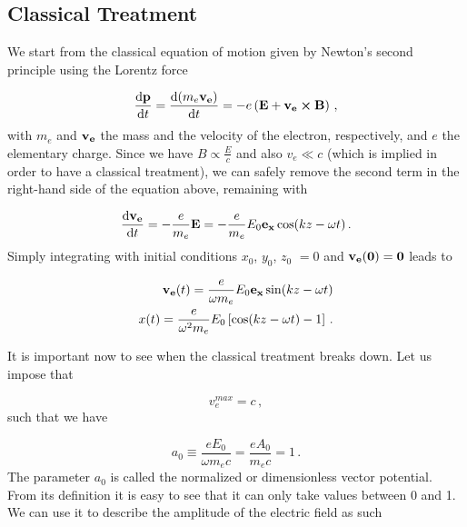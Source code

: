 \documentclass[12pt, class=report, crop=false]{standalone}
\begin{document}
\subsection{Classical Treatment}

We start from the classical equation of motion given by Newton's second principle using the Lorentz force

\begin{equation}
  \label{eq:equation-of-motion-electron}
  \dv{\vb{p}}{t} = \dv{(m_e \vb{v_e})}{t} = - e \left( \vb{E} + \vb{v_e}\cp\vb{B} \right)\,,
\end{equation}
with \(m_e\) and \(\vb{v_e}\) the mass and the velocity of the electron, respectively, and \(e\) the elementary charge. Since we have \(B\propto\frac{E}{c}\) and also \(v_e \ll c\) (which is implied in order to have a classical treatment), we can safely remove the second term in the right-hand side of the equation above, remaining with

\begin{equation}
  \dv{\vb{v_e}}{t} = - \frac{e}{m_e} \vb{E} = - \frac{e}{m_e}  E_0 \vb{e_x} \cos(kz-\omega t)\,.
\end{equation}
Simply integrating with initial conditions \(x_0\), \(y_0\), \(z_0\) \(=0\) and \(\vb{v_e(0)} = \vb{0}\) leads to

\begin{subequations}
  \begin{align}
    \vb{v_e} (t) = \frac{e}{\omega m_e} E_0 \vb{e_x} \sin(kz-\omega t) \\
    x (t) = \frac{e}{\omega^2 m_e} E_0 \left[ \cos(kz-\omega t) -1 \right]\,.
  \end{align}
\end{subequations}

It is important now to see when the classical treatment breaks down. Let us impose that

\begin{equation}
  v_e^{max} = c \,,
\end{equation}
such that we have

\begin{equation}
  a_0 \equiv \frac{e E_0}{\omega m_e c} = \frac{e A_0}{m_e c} = 1\,.
\end{equation}
The parameter \(a_0\) is called the normalized or dimensionless vector potential. From its definition it is easy to see that it can only take values between 0 and 1. We can use it to describe the amplitude of the electric field as such
\end{document}
